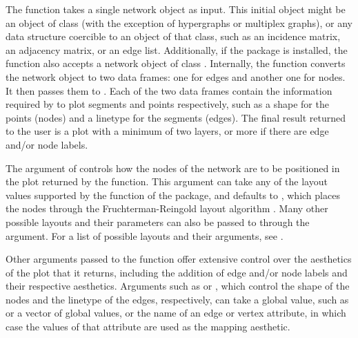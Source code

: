 The  function takes a single network object as input. This initial object might be an object of class  (with the exception of hypergraphs or multiplex graphs), or any data structure coercible to an object of that class, such as an incidence matrix, an adjacency matrix, or an edge list. Additionally, if the  package \citep{intergraph} is installed, the function  also accepts a network object of class . Internally, the function converts the network object to two data frames: one for edges and another one for nodes. It then passes them to . Each of the two data frames contain the information required by  to plot segments and points respectively, such as a shape for the points (nodes) and a linetype for the segments (edges). The final result returned to the user is a plot with a minimum of two layers, or more if there are edge and/or node labels.%

The  argument of  controls how the nodes of the network are to be positioned in the plot returned by the function. This argument can take any of the layout values supported by the  function of the  package, and defaults to , which places the nodes through the Fruchterman-Reingold layout algorithm \citep{fruchterman_reingold}. Many other possible layouts and their parameters can also be passed to  through the  argument. For a list of possible layouts and their arguments, see .

Other arguments passed to the  function offer extensive control over the aesthetics of the plot that it returns, including %
the addition of edge and/or node labels and their respective aesthetics.
Arguments such as  or , which  control the shape of the nodes and the linetype of the edges, respectively, can take a global value, such as  %
or %
a vector of global values, or the name of an edge or vertex attribute, in which case the values of that attribute are used as the mapping aesthetic.

